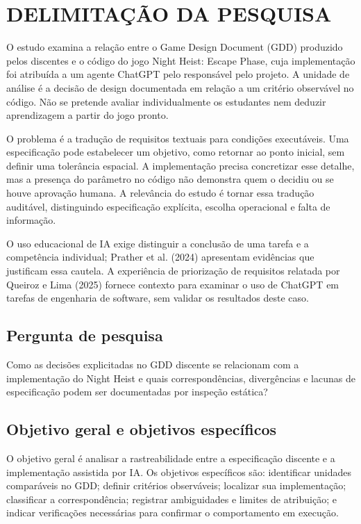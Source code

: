 \section{DELIMITAÇÃO DA PESQUISA}
O estudo examina a relação entre o Game Design Document (GDD) produzido pelos discentes e o código do jogo Night Heist: Escape Phase, cuja implementação foi atribuída a um agente ChatGPT pelo responsável pelo projeto. A unidade de análise é a decisão de design documentada em relação a um critério observável no código. Não se pretende avaliar individualmente os estudantes nem deduzir aprendizagem a partir do jogo pronto.

O problema é a tradução de requisitos textuais para condições executáveis. Uma especificação pode estabelecer um objetivo, como retornar ao ponto inicial, sem definir uma tolerância espacial. A implementação precisa concretizar esse detalhe, mas a presença do parâmetro no código não demonstra quem o decidiu ou se houve aprovação humana. A relevância do estudo é tornar essa tradução auditável, distinguindo especificação explícita, escolha operacional e falta de informação.

O uso educacional de IA exige distinguir a conclusão de uma tarefa e a competência individual; Prather et al. (2024) apresentam evidências que justificam essa cautela. A experiência de priorização de requisitos relatada por Queiroz e Lima (2025) fornece contexto para examinar o uso de ChatGPT em tarefas de engenharia de software, sem validar os resultados deste caso.

\subsection{Pergunta de pesquisa}
Como as decisões explicitadas no GDD discente se relacionam com a implementação do Night Heist e quais correspondências, divergências e lacunas de especificação podem ser documentadas por inspeção estática?

\subsection{Objetivo geral e objetivos específicos}
O objetivo geral é analisar a rastreabilidade entre a especificação discente e a implementação assistida por IA. Os objetivos específicos são: identificar unidades comparáveis no GDD; definir critérios observáveis; localizar sua implementação; classificar a correspondência; registrar ambiguidades e limites de atribuição; e indicar verificações necessárias para confirmar o comportamento em execução.

